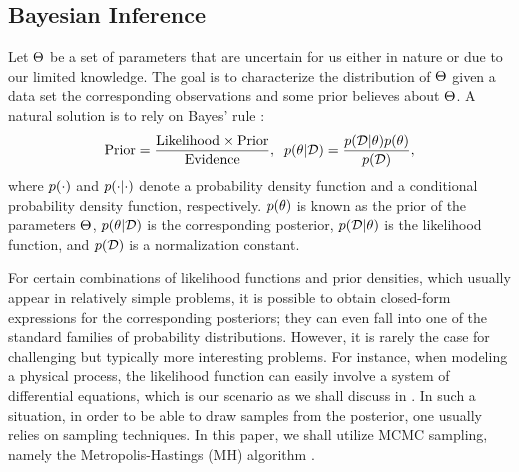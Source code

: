 \subsection{Bayesian Inference} 
Let $\Theta$ be a set of parameters that are uncertain for us either in nature or due to our limited knowledge. The goal is to characterize the distribution of $\Theta$ given a data set the corresponding observations and some prior believes about $\Theta$. A natural solution is to rely on Bayes' rule \cite{gelman2004}:
\begin{equation} \elabel{bayes}
  \text{Prior} = \frac{\text{Likelihood} \times \text{Prior}}{\text{Evidence}}, \;\; \f{\param | \data} = \frac{\f{\data | \param} \f{\param}}{\f{\data}},
\end{equation}
where $\f{\cdot}$ and $\f{\cdot | \cdot}$ denote a probability density function and a conditional probability density function, respectively. $\f{\param}$ is known as the prior of the parameters $\Theta$, $\f{\param | \data}$ is the corresponding posterior, $\f{\data | \param}$ is the likelihood function, and $\f{\data}$ is a normalization constant.

For certain combinations of likelihood functions and prior densities, which usually appear in relatively simple problems, it is possible to obtain closed-form expressions for the corresponding posteriors; they can even fall into one of the standard families of probability distributions. However, it is rarely the case for challenging but typically more interesting problems. For instance, when modeling a physical process, the likelihood function can easily involve a system of differential equations, which is our scenario as we shall discuss in . In such a situation, in order to be able to draw samples from the posterior, one usually relies on sampling techniques. In this paper, we shall utilize MCMC sampling, namely the Metropolis-Hastings (MH) algorithm \cite{gelman2004}.

